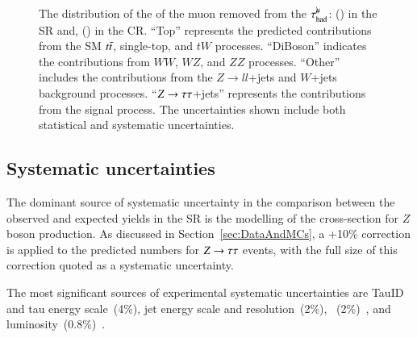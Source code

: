         \begin{figure}[htbp]
            \centering
            \caption{
                The distribution of the \pt of the muon removed from the $\tau_\mathrm{had}^{\mu\mkern-10mu\backslash}$: 
                (\protect{}) in the SR and,
                (\protect{}) in the CR. 
                ``Top'' represents the predicted contributions from the SM $t\bar{t}$, single-top, and $tW$ processes. 
                ``DiBoson'' indicates the contributions from $WW$, $WZ$, and $ZZ$ processes. 
                ``Other'' includes the contributions from the $Z\rightarrow ll$+jets and $W$+jets background processes. 
                ``$Z \rightarrow \tau\tau$+jets'' represents the contributions from the signal process.
                The uncertainties shown include both statistical and systematic uncertainties.
            }
            \label{fig:murm:pt_mu}
        \end{figure}

    \subsection{Systematic uncertainties} \label{sec:sys_uncertainties}
        The dominant source of systematic uncertainty in the comparison between the observed and expected yields in the SR is the modelling of the cross-section 
        for $Z$ boson production. As discussed in Section~\ref{sec:DataAndMCs}, a +10\% 
        correction is applied to the predicted numbers for $Z \rightarrow \tau\tau$ events, 
        with the full size of this correction quoted as a systematic uncertainty.

        The most significant sources of experimental systematic uncertainties are TauID and tau energy scale~(4\%), 
        jet energy scale and resolution~(2\%), \MET~(2\%)~\cite{Baron:2887993}, and luminosity~(0.8\%)~\cite{DAPR-2021-01}.
